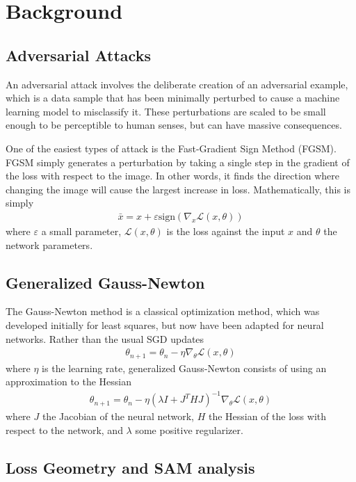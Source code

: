 \documentclass{article}
\begin{document}
\section{Background}
\subsection{Adversarial Attacks}
    An adversarial attack involves the deliberate creation of an adversarial example, which is a data sample that has been minimally perturbed to cause a machine learning model to misclassify it.
    These perturbations are scaled to be small enough to be perceptible to human senses, but can have massive consequences.

    One of the easiest types of attack is the Fast-Gradient Sign Method (FGSM).
    FGSM simply generates a perturbation by taking a single step in the gradient of the loss with respect to the image.
    In other words, it finds the direction where changing the image will cause the largest increase in loss.
    Mathematically, this is simply
    \begin{align}
        \bar x = x + \varepsilon \text{sign}(\nabla_x \mathcal L(x, \theta))
    \end{align}
    where $\varepsilon$ a small parameter, $\mathcal L(x, \theta)$ is the loss against the input $x$ and $\theta$ the network parameters.

\subsection{Generalized Gauss-Newton}
The Gauss-Newton method is a classical optimization method, which was developed initially for least squares, but now have been adapted for neural networks.
Rather than the usual SGD updates
\begin{align*}
    \theta_{n+1} = \theta_n - \eta \nabla_{\theta} \mathcal L(x, \theta)
\end{align*}
where $\eta$ is the learning rate, generalized Gauss-Newton consists of using an approximation to the Hessian
\begin{align*}
    \theta_{n+1} = \theta_n - \eta (\lambda I + J^THJ)^{-1} \nabla_{\theta} \mathcal L(x, \theta)
\end{align*}
where $J$ the Jacobian of the neural network, $H$ the Hessian of the loss with respect to the network, and $\lambda$ some positive regularizer.


\subsection{Loss Geometry and SAM analysis}
\end{document}
